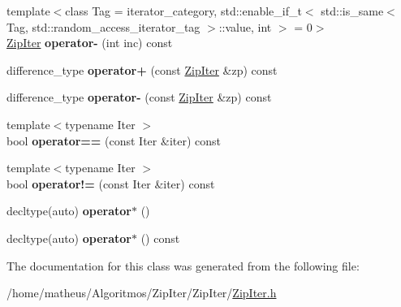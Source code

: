 \begin{DoxyCompactItemize}
\item 
{\footnotesize template$<$class Tag  = iterator\+\_\+category, std\+::enable\+\_\+if\+\_\+t$<$ std\+::is\+\_\+same$<$ Tag, std\+::random\+\_\+access\+\_\+iterator\+\_\+tag $>$\+::value, int $>$  = 0$>$ }\\\hyperlink{classit_1_1ZipIter}{Zip\+Iter} {\bfseries operator-\/} (int inc) const \hypertarget{classit_1_1ZipIter_a7506ce820349b88b88361ebf8eb866d2}{}\label{classit_1_1ZipIter_a7506ce820349b88b88361ebf8eb866d2}

\item 
difference\+\_\+type {\bfseries operator+} (const \hyperlink{classit_1_1ZipIter}{Zip\+Iter} \&zp) const \hypertarget{classit_1_1ZipIter_aacf003b55cc8d7645858e5f0ba5d4204}{}\label{classit_1_1ZipIter_aacf003b55cc8d7645858e5f0ba5d4204}

\item 
difference\+\_\+type {\bfseries operator-\/} (const \hyperlink{classit_1_1ZipIter}{Zip\+Iter} \&zp) const \hypertarget{classit_1_1ZipIter_af00fee9d7cfb49e7399cb8fba81ce623}{}\label{classit_1_1ZipIter_af00fee9d7cfb49e7399cb8fba81ce623}

\item 
{\footnotesize template$<$typename Iter $>$ }\\bool {\bfseries operator==} (const Iter \&iter) const \hypertarget{classit_1_1ZipIter_a9484f05b26b9ea05683d026a0b839dbc}{}\label{classit_1_1ZipIter_a9484f05b26b9ea05683d026a0b839dbc}

\item 
{\footnotesize template$<$typename Iter $>$ }\\bool {\bfseries operator!=} (const Iter \&iter) const \hypertarget{classit_1_1ZipIter_a7620c262be42a4fe20bb160d5fe24d40}{}\label{classit_1_1ZipIter_a7620c262be42a4fe20bb160d5fe24d40}

\item 
decltype(auto) {\bfseries operator$\ast$} ()\hypertarget{classit_1_1ZipIter_a181e261758d224815b75ff0178e1aa74}{}\label{classit_1_1ZipIter_a181e261758d224815b75ff0178e1aa74}

\item 
decltype(auto) {\bfseries operator$\ast$} () const \hypertarget{classit_1_1ZipIter_a7335113e0c9b46af16fda5fe1a646aed}{}\label{classit_1_1ZipIter_a7335113e0c9b46af16fda5fe1a646aed}

\end{DoxyCompactItemize}


The documentation for this class was generated from the following file\+:\begin{DoxyCompactItemize}
\item 
/home/matheus/\+Algoritmos/\+Zip\+Iter/\+Zip\+Iter/\hyperlink{ZipIter_8h}{Zip\+Iter.\+h}\end{DoxyCompactItemize}
